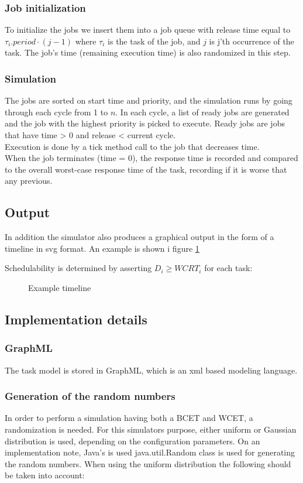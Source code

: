 \documentclass{acm_proc_article-sp}
\begin{document}
\subsubsection*{Job initialization}
To initialize the jobs we insert them into a job queue with release time equal to $\tau_{i}.period \cdot (j - 1)$ where $\tau_i$ is the task of the job, and $j$ is j'th occurrence of the task. The job's time  (remaining execution time) is also randomized in this step.
\subsubsection*{Simulation}
The jobs are sorted on start time and priority, and the simulation runs by going through each cycle from 1 to $n$. In each cycle, a list of ready jobs are generated and the job with the highest priority is picked to execute. Ready jobs are jobs that have time > 0 and release < current cycle.\\
Execution is done by a tick method call to the job that decreases time.\\
When the job terminates (time = 0), the response time is recorded and compared to the overall worst-case response time of the task, recording if it is worse that any previous.

\subsection{Output}

In addition the simulator also produces a graphical output in the form of a timeline in svg format. An example is shown i figure \ref{fig:example_timeline_output}


Schedulability is determined by asserting $D_i \geq WCRT_i$ for each task:

\begin{figure}[h]
\centering
{}
\caption{Example timeline}
\label{fig:example_timeline_output}
\end{figure}\subsection{Implementation details}

\subsubsection{GraphML}
The task model is stored in GraphML, which is an xml based modeling language.
\subsubsection{Generation of the random numbers}
In order to perform a simulation having both a BCET and WCET, a randomization is needed. For this simulators purpose, either uniform or Gaussian distribution is used, depending on the configuration parameters. On an implementation note, Java's is used java.util.Random class is used for generating the random numbers. When using the uniform distribution the following should be taken into account:
\end{document}
